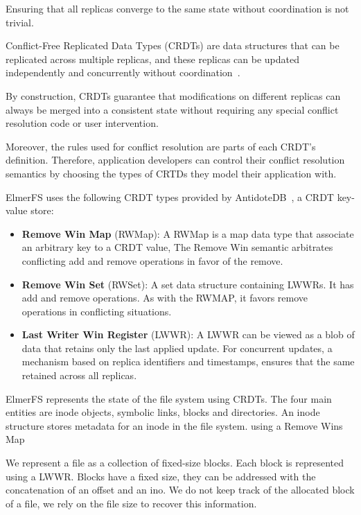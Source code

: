 \documentclass[sigconf, anonymous, 10pt]{acmart}
\begin{document}
Ensuring that all replicas converge to the same state without coordination
is not trivial.

Conflict-Free Replicated Data Types (CRDTs) are data structures that
can be replicated across multiple replicas,
and these replicas can be updated independently and concurrently without coordination~\cite{shapiro2011conflict}.

By construction, CRDTs guarantee that modifications on different
replicas can always be merged into a consistent state without requiring
any special conflict resolution code or user intervention.

Moreover, the rules used for conflict resolution are parts of each CRDT's definition.
Therefore, application developers can control their conflict resolution semantics by
choosing the types of CRTDs they model their application with.

ElmerFS uses the following CRDT types provided by AntidoteDB~\cite{akkoorath2016antidote}, a CRDT key-value store:

\begin{itemize}
	\item \textbf{Remove Win Map} (RWMap): A RWMap is a map data type that associate an arbitrary key to a CRDT value, The Remove Win semantic arbitrates conflicting add and remove operations in favor of the remove.
	\item \textbf{Remove Win Set} (RWSet): A set data structure containing LWWRs. It has add and
    remove operations. As with the RWMAP, it favors remove operations in conflicting situations.
	\item \textbf{Last Writer Win Register} (LWWR): A LWWR can be viewed as a blob of data that retains only the last applied update.
    For concurrent updates, a mechanism based on replica identifiers and timestamps,
    ensures that the same retained across all replicas.
\end{itemize}

ElmerFS represents the state of the file system using CRDTs.
The four main entities are inode objects, symbolic links, blocks and directories.
An inode structure stores metadata for an inode in the file system. using a Remove Wins Map

We represent a file as a collection of fixed-size blocks. Each block is represented using a LWWR.
Blocks have a fixed size, they can be addressed with the concatenation of an offset and an ino.
We do not keep track of the allocated block of a file, we rely on the file size to recover this information.
\end{document}
